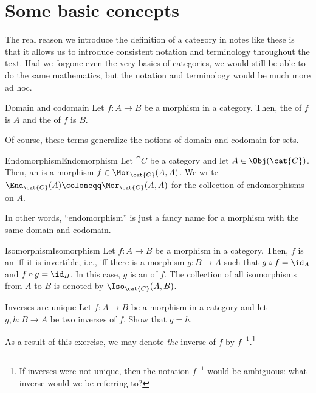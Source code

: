 \section{Some basic concepts}

The real reason we introduce the definition of a category in notes like these is that it allows us to introduce consistent notation and terminology throughout the text.  Had we forgone even the very basics of categories, we would still be able to do the same mathematics, but the notation and terminology would be much more ad hoc.
\begin{dfn}{Domain and codomain}{}
Let $f\colon A\rightarrow B$ be a morphism in a category.  Then, the  of $f$ is $A$ and the  of $f$ is $B$.
\begin{rmk}
Of course, these terms generalize the notions of domain and codomain for sets.
\end{rmk}
\end{dfn}
\begin{dfn}{Endomorphism}{Endomorphism}
Let $\cat{C}$ be a category and let $A\in \Obj (\cat{C})$.  Then, an  is a morphism $f\in \Mor _{\cat{C}}(A,A)$.  We write $\End _{\cat{C}}(A)\coloneqq \Mor _{\cat{C}}(A,A)$ for the collection of endomorphisms on $A$.
\begin{rmk}
In other words, ``endomorphism'' is just a fancy name for a morphism with the same domain and codomain.
\end{rmk}
\end{dfn}
\begin{dfn}{Isomorphism}{Isomorphism}
Let $f\colon A\rightarrow B$ be a morphism in a category.  Then, $f$ is an  iff it is invertible, i.e., iff there is a morphism $g\colon B\rightarrow A$ such that $g\circ f=\id _A$ and $f\circ g=\id _B$.  In this case, $g$ is an  of $f$.  The collection of all isomorphisms from $A$ to $B$ is denoted by $\Iso _{\cat{C}}(A,B)$.
\end{dfn}
\begin{exr}{}{Inverses are unique}
Let $f\colon A\rightarrow B$ be a morphism in a category and let $g,h \colon B\rightarrow A$ be two inverses of $f$.  Show that $g=h$.
\begin{rmk}
As a result of this exercise, we may denote \emph{the} inverse of $f$ by $f^{-1}$.\footnote{If inverses were not unique, then the notation $f^{-1}$ would be ambiguous:  what inverse would we be referring to?}
\end{rmk}
\end{exr}
